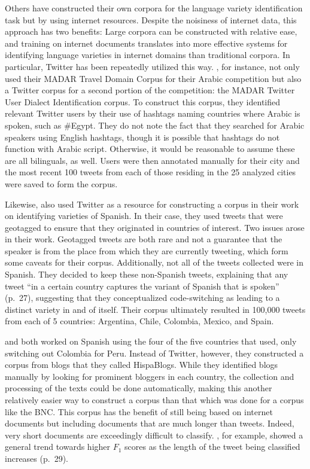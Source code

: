 \documentclass{article}
\begin{document}
      Others have constructed their own corpora for the language variety identification task but by using internet resources.
      Despite the noisiness of internet data, this approach has two benefits: Large corpora can be constructed with relative ease, and training on internet documents translates into more effective systems for identifying language varieties in internet domains than traditional corpora.
      In particular, Twitter has been repeatedly utilized this way.
      \textcite{bouamor_madar_2019}, for instance, not only used their MADAR Travel Domain Corpus for their Arabic competition but also a Twitter corpus for a second portion of the competition: the MADAR Twitter User Dialect Identification corpus.
      To construct this corpus, they identified relevant Twitter users by their use of hashtags naming countries where Arabic is spoken, such as \#Egypt.
      They do not note the fact that they searched for Arabic speakers using English hashtags, though it is possible that hashtags do not function with Arabic script.
      Otherwise, it would be reasonable to assume these are all bilinguals, as well.
      Users were then annotated manually for their city and the most recent 100 tweets from each of those residing in the 25 analyzed cities were saved to form the corpus.

      Likewise, \textcite{maier_language_2014} also used Twitter as a resource for constructing a corpus in their work on identifying varieties of Spanish.
      In their case, they used tweets that were geotagged to ensure that they originated in countries of interest.
      Two issues arose in their work.
      Geotagged tweets are both rare and not a guarantee that the speaker is from the place from which they are currently tweeting, which form some caveats for their corpus.
      Additionally, not all of the tweets collected were in Spanish.
      They decided to keep these non-Spanish tweets, explaining that any tweet ``in a certain country captures the variant of Spanish that is spoken'' (p.~27), suggesting that they conceptualized code-switching as leading to a distinct variety in and of itself.
      Their corpus ultimately resulted in 100,000 tweets from each of 5 countries: Argentina, Chile, Colombia, Mexico, and Spain.

      \textcite{franco-salvador_language_2015} and \textcite{rangel_low_2018} both worked on Spanish using the four of the five countries that \textcite{maier_language_2014} used, only switching out Colombia for Peru.
      Instead of Twitter, however, they constructed a corpus from blogs that they called HispaBlogs.
      While they identified blogs manually by looking for prominent bloggers in each country, the collection and processing of the texts could be done automatically, making this another relatively easier way to construct a corpus than that which was done for a corpus like the BNC.
      This corpus has the benefit of still being based on internet documents but including documents that are much longer than tweets.
      Indeed, very short documents are exceedingly difficult to classify.
      \textcite{maier_language_2014}, for example, showed a general trend towards higher $F_1$ scores as the length of the tweet being classified increases (p.~29).
\end{document}
